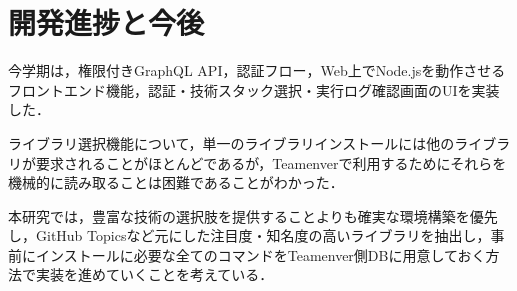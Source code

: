 \documentclass[main]{subfiles}
\begin{document}
\section{開発進捗と今後}
 今学期は，権限付きGraphQL API，認証フロー，Web上でNode.jsを動作させるフロントエンド機能，認証・技術スタック選択・実行ログ確認画面のUIを実装した．

 ライブラリ選択機能について，単一のライブラリインストールには他のライブラリが要求されることがほとんどであるが，Teamenverで利用するためにそれらを機械的に読み取ることは困難であることがわかった．

 本研究では，豊富な技術の選択肢を提供することよりも確実な環境構築を優先し，GitHub Topicsなど元にした注目度・知名度の高いライブラリを抽出し，事前にインストールに必要な全てのコマンドをTeamenver側DBに用意しておく方法で実装を進めていくことを考えている．
\end{document}
